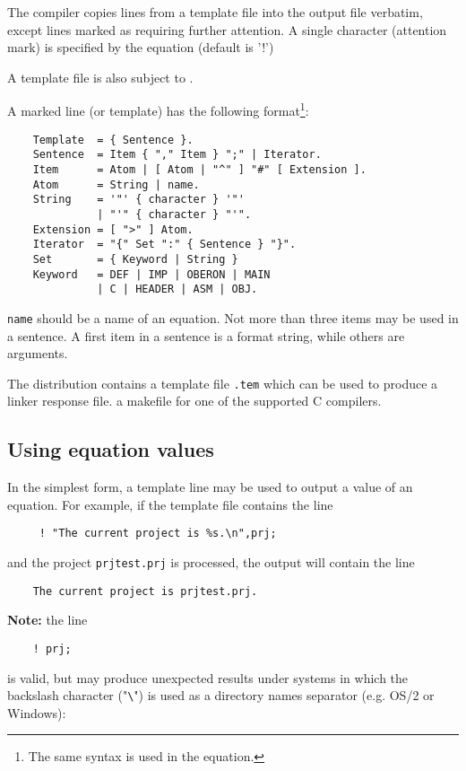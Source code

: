 The compiler copies lines from a template file into the
output file verbatim, except lines marked as requiring further
attention. A single character (attention mark) is specified by the
equation  (default is '!') %

A template file is also subject to .

A marked line (or template) has the following
format\footnote{The same syntax is used in the
 equation.}:
\begin{verbatim}
    Template  = { Sentence }.
    Sentence  = Item { "," Item } ";" | Iterator.
    Item      = Atom | [ Atom | "^" ] "#" [ Extension ].
    Atom      = String | name.
    String    = '"' { character } '"'
              | "'" { character } "'".
    Extension = [ ">" ] Atom.
    Iterator  = "{" Set ":" { Sentence } "}".
    Set       = { Keyword | String }
    Keyword   = DEF | IMP | OBERON | MAIN
              | C | HEADER | ASM | OBJ.
\end{verbatim}
{\tt name} should be a name of an equation. Not more than three items
may be used in a sentence. A first item in a sentence is a format
string, while others are arguments.                                        %

The \XDS{} distribution contains a template file {\tt \xc{}.tem} which
can be used to produce
\ifgencode
a linker response file.
\fi
\ifgenc
a makefile for one of the supported C compilers.
\fi

\subsection{Using equation values}

In the simplest form, a template line may be used to output a value of
an equation. For example, if the template file contains the line

\verb'     ! "The current project is %s.\n",prj;'

and the project {\tt prj\DirSep{}test.prj} is processed,
the output will contain the line

\verb'    The current project is prj'{\tt \DirSep{}}\verb'test.prj.'

{\bf Note:} the line

\verb'    ! prj;'

is valid, but may produce unexpected results under systems in which
the backslash character ("\verb'\'") is used as a directory names separator
(e.g. OS/2 or Windows):

